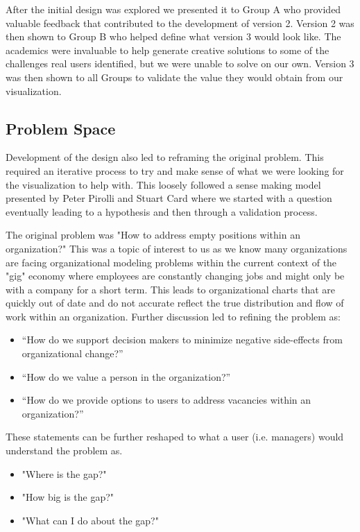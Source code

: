 \documentclass[journal]{vgtc}                %
\begin{document}
After the initial design was explored we presented it to Group A who provided valuable feedback that contributed to the development of version 2.  Version 2 was then shown to Group B who helped define what version 3 would look like.  The academics were invaluable to help generate creative solutions to some of the challenges real users identified, but we were unable to solve on our own.  Version 3 was then shown to all Groups to validate the value they would obtain from our visualization.

\subsection{Problem Space}
Development of the design also led to reframing the original problem.  This required an iterative process to try and make sense of what we were looking for the visualization to help with.  This loosely followed a sense making model presented by Peter Pirolli and Stuart Card\cite{cognativetaskanalysis} where we started with a question eventually leading to a hypothesis and then through a validation process.  

The original problem was "How to address empty positions within an organization?"  This was a topic of interest to us as we know many organizations are facing organizational modeling problems within the current context of the "gig" economy where employees are constantly changing jobs and might only be with a company for a short term.  This leads to organizational charts that are quickly out of date and do not accurate reflect the true distribution and flow of work within an organization.  
Further discussion led to refining the problem as:
\begin{itemize}
\item “How do we support decision makers to minimize negative side-effects from organizational change?”
\item “How do we value a person in the organization?”
\item “How do we provide options to users to address vacancies within an organization?”
\end{itemize}
These statements can be further reshaped to what a user (i.e. managers) would understand the problem as.
\begin{itemize}
\item "Where is the gap?"
\item "How big is the gap?"
\item "What can I do about the gap?"
\end{itemize}
\end{document}
